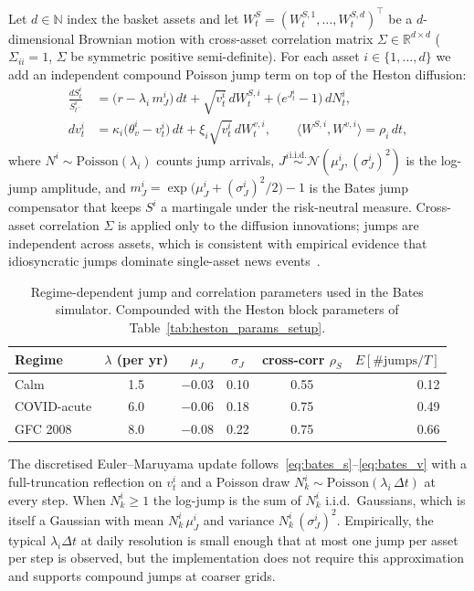 \documentclass[11pt,oneside]{report}
\newcommand{\R}{\mathbb{R}}
\begin{document}
Let $d\in\mathbb{N}$ index the basket assets and let $W_t^S = (W_t^{S,1},\ldots,W_t^{S,d})^\top$ be a $d$-dimensional Brownian motion with cross-asset correlation matrix $\Sigma\in\R^{d\times d}$ ($\Sigma_{ii}=1$, $\Sigma$ be symmetric positive semi-definite).  For each asset $i\in\{1,\ldots,d\}$ we add an independent compound Poisson jump term on top of the Heston diffusion:
\begin{align}
\frac{dS_t^i}{S_{t^-}^i} &= \bigl(r - \lambda_i\, m_J^i\bigr)\,dt + \sqrt{v_t^i}\, dW_t^{S,i} + \bigl(e^{J_t^i}-1\bigr)\,dN_t^i, \label{eq:bates_s}\\
dv_t^i &= \kappa_i\bigl(\theta_v^i - v_t^i\bigr)\,dt + \xi_i\sqrt{v_t^i}\, dW_t^{v,i}, \qquad
\langle W^{S,i},W^{v,i}\rangle = \rho_i\,dt, \label{eq:bates_v}
\end{align}
where $N^i\sim\mathrm{Poisson}(\lambda_i)$ counts jump arrivals, $J^i \stackrel{\text{i.i.d.}}{\sim} \mathcal{N}(\mu_J^i, (\sigma_J^i)^2)$ is the log-jump amplitude, and $m_J^i = \exp\!\bigl(\mu_J^i + (\sigma_J^i)^2/2\bigr)-1$ is the Bates jump compensator that keeps $S^i$ a martingale under the risk-neutral measure.  Cross-asset correlation $\Sigma$ is applied only to the diffusion innovations; jumps are independent across assets, which is consistent with empirical evidence that idiosyncratic jumps dominate single-asset news events~\citep{cont2001empirical}.

\begin{table}[H]
\centering\small
\caption{Regime-dependent jump and correlation parameters used in the Bates simulator.  Compounded with the Heston block parameters of Table~\ref{tab:heston_params_setup}.}
\label{tab:bates_calibrations}
\begin{tabular}{@{}lccccr@{}}
\toprule
\textbf{Regime} & $\lambda$ (per yr) & $\mu_J$ & $\sigma_J$ & cross-corr $\rho_{S}$ & $E[\#\text{jumps}/T]$ \\\midrule
Calm                & 1.5 & $-0.03$ & 0.10 & 0.55 & 0.12 \\
COVID-acute         & 6.0 & $-0.06$ & 0.18 & 0.75 & 0.49 \\
GFC 2008            & 8.0 & $-0.08$ & 0.22 & 0.75 & 0.66 \\
\bottomrule
\end{tabular}
\end{table}

The discretised Euler--Maruyama update follows~\eqref{eq:bates_s}--\eqref{eq:bates_v} with a full-truncation reflection on $v_{t}^i$ and a Poisson draw $N_k^i\sim\mathrm{Poisson}(\lambda_i\,\Delta t)$ at every step.  When $N_k^i\ge1$ the log-jump is the sum of $N_k^i$ i.i.d.\ Gaussians, which is itself a Gaussian with mean $N_k^i\,\mu_J^i$ and variance $N_k^i\,(\sigma_J^i)^2$.  Empirically, the typical $\lambda_i\Delta t$ at daily resolution is small enough that at most one jump per asset per step is observed, but the implementation does not require this approximation and supports compound jumps at coarser grids.
\end{document}
